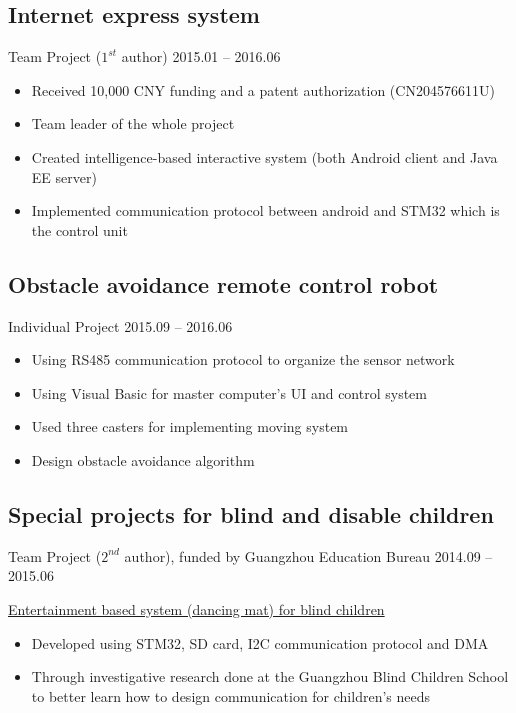 \documentclass[11pt,a4paper,sans]{moderncv}
\begin{document}
\subsection{Internet express system}
Team Project ($1^{st}$ author) \hfill 2015.01 -- 2016.06
\vspace{2pt}
\begin{itemize}
\item Received 10,000 CNY funding and a patent authorization (CN204576611U)
\item Team leader of the whole project
\item Created intelligence-based interactive system (both Android client and Java EE server)
\item Implemented communication protocol between android and STM32 which is the control unit
\end{itemize}

\subsection{Obstacle avoidance remote control robot}
Individual Project \hfill 2015.09 -- 2016.06
\vspace{2pt}
\begin{itemize}
\item Using RS485 communication protocol to organize the sensor network
\item Using Visual Basic for master computer's UI and control system
\item Used three casters for implementing moving system
\item Design obstacle avoidance algorithm
\end{itemize}

\subsection{Special projects for blind and disable children}
Team Project ($2^{nd}$ author), funded by Guangzhou Education Bureau \hfill 2014.09 -- 2015.06

\vspace{1em}
\underline{Entertainment based system (dancing mat) for blind children}
\vspace{2pt}
\begin{itemize}
\item Developed using STM32, SD card, I2C communication protocol and DMA
\item Through investigative research done at the Guangzhou Blind Children School to better learn how to design communication for children's needs
\end{itemize}
\end{document}
